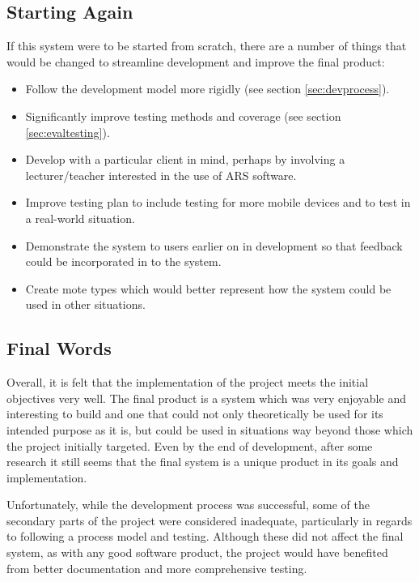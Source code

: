 \documentclass[a4papert,11pt,notitlepage]{article}
\begin{document}
\subsection{Starting Again}
If this system were to be started from scratch, there are a number of things that would be changed to streamline development and improve the final product:
\begin{itemize}
\item Follow the development model more rigidly (see section \ref{sec:devprocess}).
\item Significantly improve testing methods and coverage (see section \ref{sec:evaltesting}).
\item Develop with a particular client in mind, perhaps by involving a lecturer/teacher interested in the use of ARS software.
\item Improve testing plan to include testing for more mobile devices and to test in a real-world situation.
\item Demonstrate the system to users earlier on in development so that feedback could be incorporated in to the system.
\item Create mote types which would better represent how the system could be used in other situations.
\end{itemize}

\subsection{Final Words}
Overall, it is felt that the implementation of the project meets the initial objectives very well. The final product is a system which was very enjoyable and interesting to build and one that could not only theoretically be used for its intended purpose as it is, but could be used in situations way beyond those which the project initially targeted. Even by the end of development, after some research it still seems that the final system is a unique product in its goals and implementation.

Unfortunately, while the development process was successful, some of the secondary parts of the project were considered inadequate, particularly in regards to following a process model and testing. Although these did not affect the final system, as with any good software product, the project would have benefited from better documentation and more comprehensive testing.

\clearpage
{}

\end{document}
